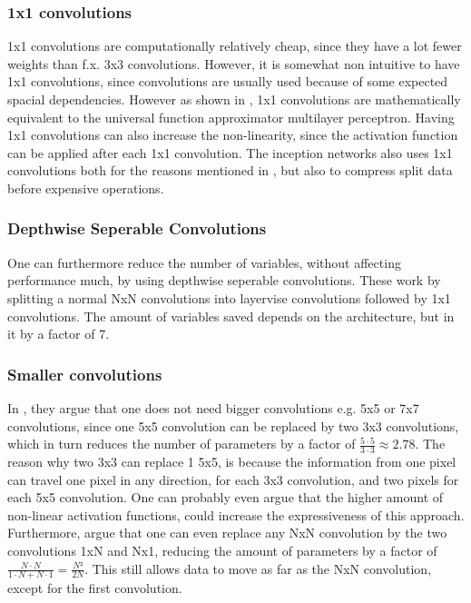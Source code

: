 \subsubsection{1x1 convolutions}
1x1 convolutions are computationally relatively cheap, since they have a lot fewer weights than f.x. 3x3 convolutions. However, it is somewhat non intuitive to have 1x1 convolutions, since convolutions are usually used because of some expected spacial dependencies. However as shown in \cite{NetworkInNetwork}, 1x1 convolutions are mathematically equivalent to the universal function approximator multilayer perceptron. Having 1x1 convolutions can also increase the non-linearity, since the activation function can be applied after each 1x1 convolution. The inception networks also uses 1x1 convolutions\cite{Inception}\cite{InceptionV3}\cite{InceptionV4} both for the reasons mentioned in \cite{NetworkInNetwork}, but also to compress split data before expensive operations\cite{Inception}\cite{InceptionV3}\cite{InceptionV4}.

\subsubsection{Depthwise Seperable Convolutions}
One can furthermore reduce the number of variables, without affecting performance much, by using depthwise seperable convolutions\cite{MobileNets}\cite{xception}. These work by splitting a normal NxN convolutions into layervise convolutions followed by 1x1 convolutions. The amount of variables saved depends on the architecture, but in \cite{MobileNets} it by a factor of 7.

\subsubsection{Smaller convolutions} %
In \cite{InceptionV3}, they argue that one does not need bigger convolutions e.g. 5x5 or 7x7 convolutions, since one 5x5 convolution can be replaced by two 3x3 convolutions, which in turn reduces the number of parameters by a factor of $\frac{5\cdot5}{3\cdot3}\approx2.78$. The reason why two 3x3 can replace 1 5x5, is because the information from one pixel can travel one pixel in any 
direction, for each 3x3 convolution, and two pixels for each 5x5 convolution. One can probably even argue that the higher amount of non-linear activation functions, could increase the expressiveness of this approach. Furthermore, \cite{InceptionV3} argue that one can even replace any NxN convolution by the two convolutions 1xN and Nx1, reducing the amount of parameters by a factor of $\frac{N\cdot N}{1\cdot N + N\cdot 1} = \frac{N²}{2N}$. This still allows data to move as far as the NxN convolution, except for the first convolution\cite{InceptionV3}.

